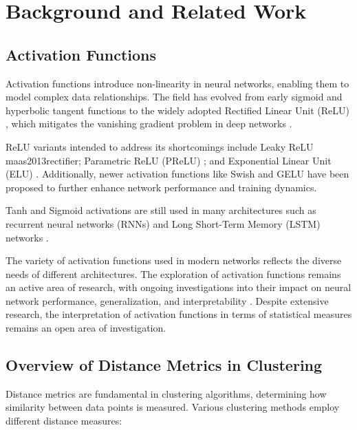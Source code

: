 \section{Background and Related Work}

\subsection{Activation Functions}

Activation functions introduce non-linearity in neural networks, enabling them to model complex data relationships. The field has evolved from early sigmoid and hyperbolic tangent functions \citep{rosenblatt1958perceptron} to the widely adopted Rectified Linear Unit (ReLU) \citep{nair2010rectified}, which mitigates the vanishing gradient problem in deep networks \citep{glorot2010understanding, krizhevsky2012imagenet}.

ReLU variants intended to address its shortcomings include Leaky ReLU {maas2013rectifier}; Parametric ReLU (PReLU) \citep{he2015delving}; and Exponential Linear Unit (ELU) \citep{clevert2015fast}. Additionally, newer activation functions like Swish \citep{ramachandran2017searching} and GELU \citep{hendrycks2016gaussian} have been proposed to further enhance network performance and training dynamics.

Tanh and Sigmoid activations are still used in many architectures such as recurrent neural networks (RNNs) and Long Short-Term Memory (LSTM) networks \citep{hochreiter1997long}.

The variety of activation functions used in modern networks reflects the diverse needs of different architectures. The exploration of activation functions remains an active area of research, with ongoing investigations into their impact on neural network performance, generalization, and interpretability \citep{ramachandran2017searching}. Despite extensive research, the interpretation of activation functions in terms of statistical measures remains an open area of investigation.

\subsection{Overview of Distance Metrics in Clustering}

Distance metrics are fundamental in clustering algorithms, determining how similarity between data points is measured. Various clustering methods employ different distance measures:

